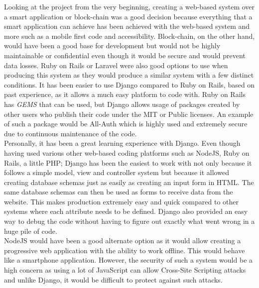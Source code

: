 \documentclass[../main.tex]{subfiles}
\begin{document}
\raggedright
Looking at the project from the very beginning, creating a web-based system over a smart application or block-chain was a good decision because everything that a smart application can achieve has been achieved with the web-based system and more such as a mobile first code and accessibility. Block-chain, on the other hand, would have been a good base for development but would not be highly maintainable or confidential even though it would be secure and would prevent data losses. Ruby on Rails or Laravel were also good options to use when producing this system as they would produce a similar system with a few distinct conditions. It has been easier to use Django compared to Ruby on Rails, based on past experience, as it allows a much easy platform to code with. Ruby on Rails has \textit{GEMS} that can be used, but Django allows usage of packages created by other users who publish their code under the MIT or Public licenses. An example of such a package would be All-Auth which is highly used and extremely secure due to continuous maintenance of the code. \\[4mm]

Personally, it has been a great learning experience with Django. Even though having used various other web-based coding platforms such as NodeJS, Ruby on Rails, a little PHP; Django has been the easiest to work with not only because it follows a simple model, view and controller system but because it allowed creating database schemas just as easily as creating an input form in HTML. The same database schemas can then be used as forms to receive data from the website. This makes production extremely easy and quick compared to other systems where each attribute needs to be defined. Django also provided an easy way to debug the code without having to figure out exactly what went wrong in a huge pile of code.  \\[4mm]

NodeJS would have been a good alternate option as it would allow creating a progressive web application with the ability to work offline. This would behave like a smartphone application. However, the security of such a system would be a high concern as using a lot of JavaScript can allow Cross-Site Scripting attacks and unlike Django, it would be difficult to protect against such attacks. 
\end{document}
